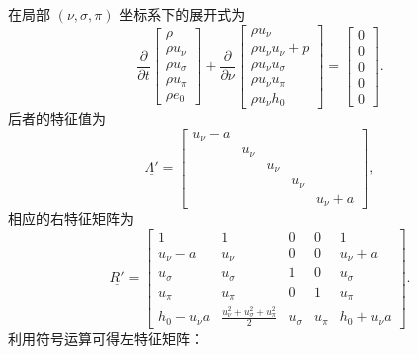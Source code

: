 在局部 $(\nu,\sigma,\pi)$ 坐标系下的展开式为
\begin{equation}
\frac{\partial}{\partial t}\begin{bmatrix}\rho\\
\rho u_{\nu}\\
\rho u_{\sigma}\\
\rho u_{\pi}\\
\rho e_{0}
\end{bmatrix}+\frac{\partial}{\partial\nu}\begin{bmatrix}\rho u_{\nu}\\
\rho u_{\nu}u_{\nu}+p\\
\rho u_{\nu}u_{\sigma}\\
\rho u_{\nu}u_{\pi}\\
\rho u_{\nu}h_{0}
\end{bmatrix}=\begin{bmatrix}0\\
0\\
0\\
0\\
0
\end{bmatrix}.
\end{equation}
后者的特征值为
\begin{equation}
\underline{\varLambda'}=\begin{bmatrix}u_{\nu}-a\\
 & u_{\nu}\\
 &  & u_{\nu}\\
 &  &  & u_{\nu}\\
 &  &  &  & u_{\nu}+a
\end{bmatrix},
\end{equation}
相应的右特征矩阵为\newpage
\begin{equation}
\underline{R'}=\begin{bmatrix}1 & 1 & 0 & 0 & 1\\
u_{\nu}-a & u_{\nu} & 0 & 0 & u_{\nu}+a\\
u_{\sigma} & u_{\sigma} & 1 & 0 & u_{\sigma}\\
u_{\pi} & u_{\pi} & 0 & 1 & u_{\pi}\\
h_{0}-u_{\nu}a & \frac{u_{\nu}^{2}+u_{\sigma}^{2}+u_{\pi}^{2}}{2} & u_{\sigma} & u_{\pi} & h_{0}+u_{\nu}a
\end{bmatrix}.
\end{equation}
利用符号运算可得左特征矩阵：
